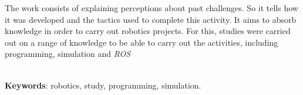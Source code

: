 \begin{thesisabastract}
    The work consists of explaining perceptions about past challenges. So it tells how it was developed and the tactics used to complete this activity. It aims to absorb knowledge in order to carry out robotics projects. For this, studies were carried out on a range of knowledge to be able to carry out the activities, including programming, simulation and \textit{ROS}


\ \\


\textbf{Keywords}: robotics, study, programming, simulation.

\end{thesisabastract}
